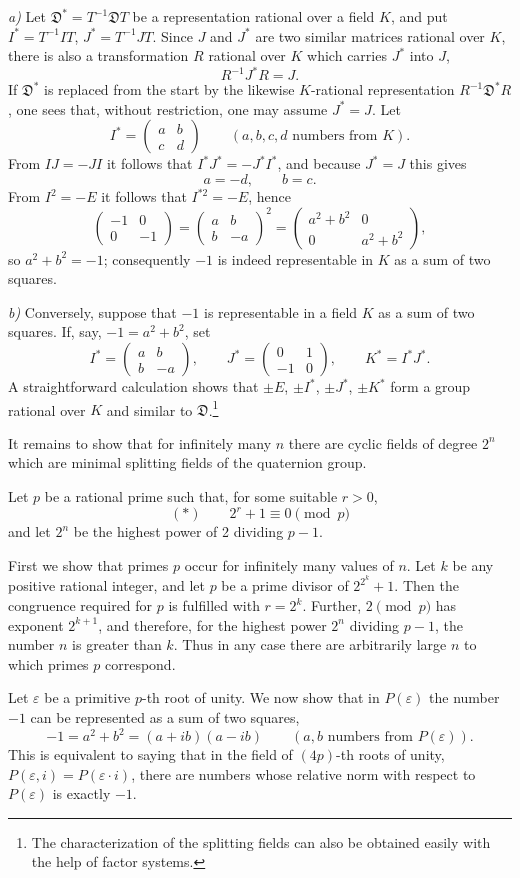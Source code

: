\documentclass[11pt]{article}
\newcommand{\mat}[1]{\begin{pmatrix}#1\end{pmatrix}}
\begin{document}
\emph{a)} Let $\mathfrak{D}^*=T^{-1}\mathfrak{D}T$ be a representation rational over a field $K$, and put $I^*=T^{-1}IT$, $J^*=T^{-1}JT$. Since $J$ and $J^*$ are two similar matrices rational over $K$, there is also a transformation $R$ rational over $K$ which carries $J^*$ into $J$,
\[
        R^{-1}J^*R=J.
\]
If $\mathfrak{D}^*$ is replaced from the start by the likewise $K$-rational representation $R^{-1}\mathfrak{D}^*R$, one sees that, without restriction, one may assume $J^*=J$. Let
\[
        I^*=\mat{a&b\\ c&d}\qquad (a,b,c,d\text{ numbers from }K).
\]
From $IJ=-JI$ it follows that $I^*J^*=-J^*I^*$, and because $J^*=J$ this gives
\[
        a=-d,
        \qquad b=c.
\]
From $I^2=-E$ it follows that $I^{*2}=-E$, hence
\[
        \mat{-1&0\\0&-1}=\mat{a&b\\ b&-a}^2
        =\mat{a^2+b^2&0\\0&a^2+b^2},
\]
so $a^2+b^2=-1$; consequently $-1$ is indeed representable in $K$ as a sum of two squares.

\emph{b)} Conversely, suppose that $-1$ is representable in a field $K$ as a sum of two squares. If, say, $-1=a^2+b^2$, set
\[
        I^*=\mat{a&b\\ b&-a},\qquad
        J^*=\mat{0&1\\-1&0},\qquad
        K^*=I^*J^*.
\]
A straightforward calculation shows that $\pm E$, $\pm I^*$, $\pm J^*$, $\pm K^*$ form a group rational over $K$ and similar to $\mathfrak{D}$.\footnote{The characterization of the splitting fields can also be obtained easily with the help of factor systems.}

It remains to show that for infinitely many $n$ there are cyclic fields of degree $2^n$ which are minimal splitting fields of the quaternion group.

Let $p$ be a rational prime such that, for some suitable $r>0$,
\[
        (*)\qquad 2^r+1\equiv0\pmod p
\]
and let $2^n$ be the highest power of 2 dividing $p-1$.

First we show that primes $p$ occur for infinitely many values of $n$. Let $k$ be any positive rational integer, and let $p$ be a prime divisor of $2^{2^k}+1$. Then the congruence required for $p$ is fulfilled with $r=2^k$. Further, $2\pmod p$ has exponent $2^{k+1}$, and therefore, for the highest power $2^n$ dividing $p-1$, the number $n$ is greater than $k$. Thus in any case there are arbitrarily large $n$ to which primes $p$ correspond.

Let $\varepsilon$ be a primitive $p$-th root of unity. We now show that in $P(\varepsilon)$ the number $-1$ can be represented as a sum of two squares,
\[
        -1=a^2+b^2=(a+ib)(a-ib)\qquad (a,b\text{ numbers from }P(\varepsilon)).
\]
This is equivalent to saying that in the field of $(4p)$-th roots of unity, $P(\varepsilon,i)=P(\varepsilon\cdot i)$, there are numbers whose relative norm with respect to $P(\varepsilon)$ is exactly $-1$.
\end{document}
